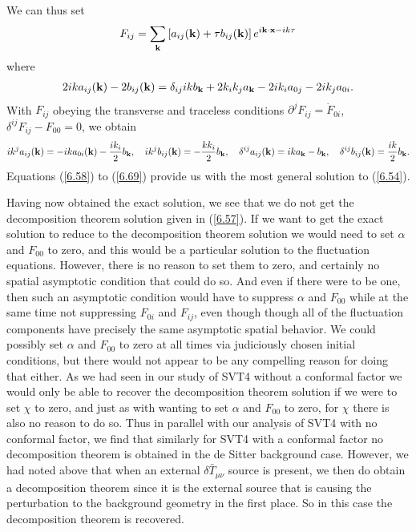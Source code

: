 \documentclass[aps,onecolumn,10pt]{revtex4}
\numberwithin{equation}{section}
\numberwithin{equation}{section}
\begin{document}
%
We can thus set 
%
\begin{eqnarray}
F_{ij}=\sum_{\bf k}\left[a_{ij}({\bf k})+\tau b_{ij}({\bf k})\right]e^{i{\bf k}\cdot {\bf x}-ik\tau}
\label{6.67}
\end{eqnarray}
%
where 
%
\begin{eqnarray}
2ika_{ij}({\bf k})-2b_{ij}({\bf k})=\delta_{ij}ikb_{\bf k}+2k_ik_ja_{\bf k}-2ik_ia_{0j}-2ik_ja_{0i}.
\label{6.68}
\end{eqnarray}
%
With $F_{ij}$ obeying the transverse and traceless conditions $\partial^{j}F_{ij}=\dot{F}_{0i}$, $\delta^{ij}F_{ij}-F_{00}=0$, we obtain 
%
\begin{eqnarray}
ik^ja_{ij}({\bf k})=-ika_{0i}({\bf k})-\frac{ik_i}{2}b_{\bf k},\quad ik^jb_{ij}({\bf k})=-\frac{kk_i}{2}b_{\bf k}, \quad
\delta^{ij}a_{ij}({\bf k})=ika_{\bf k}-b_{\bf k},
\quad \delta^{ij}b_{ij}({\bf k})=\frac{ik}{2}b_{\bf k}.
\label{6.69}
\end{eqnarray}
%
Equations (\ref{6.58}) to (\ref{6.69}) provide us with the most general solution to (\ref{6.54}).


Having now obtained the exact solution, we see that  we do not get the decomposition theorem solution given in (\ref{6.57}). If we want to get the exact solution to reduce to the decomposition theorem solution we would need to set $\alpha$ and $F_{00}$ to zero, and this would be a particular solution to the fluctuation equations. However, there is no reason to set them to zero, and certainly no spatial asymptotic condition that could do so. And even if there were to be one, then such an asymptotic condition would have to suppress $\alpha$ and $F_{00}$ while at the same time not suppressing $F_{0i}$ and $F_{ij}$, even though though all of the fluctuation components have precisely the same asymptotic spatial behavior. We could possibly set $\alpha$ and $F_{00}$ to zero at all times via judiciously chosen initial conditions, but there would not appear to be any compelling reason for doing that either. As we had seen in our study of SVT4 without a conformal factor we would only be able to recover the decomposition theorem solution if we were to set $\chi$ to zero, and just as with wanting to set $\alpha$ and $F_{00}$ to zero, for $\chi$ there is also no reason  to do so. Thus in parallel with our analysis of SVT4 with no conformal factor, we find that similarly for SVT4 with a conformal factor no decomposition theorem is obtained in the de Sitter background case. However, we had noted above that when an external $\delta\bar{T}_{\mu\nu}$ source is present, we then do obtain a decomposition theorem since it is the external source that is causing the perturbation to the background geometry in the first place. So in this case the decomposition theorem is recovered.
\end{document}
